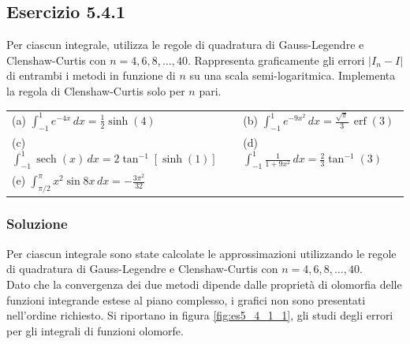 \documentclass[letterpaper, 12pt]{article}
\numberwithin{equation}{section}    %
\begin{document}
\subsection{Esercizio 5.4.1}
Per ciascun integrale, utilizza le regole di quadratura di Gauss-Legendre e 
Clenshaw-Curtis con $n=4,6,8,\ldots,40$. Rappresenta graficamente gli errori $|I_n-I|$ di entrambi i metodi 
in funzione di $n$ su una scala semi-logaritmica. Implementa la regola di 
Clenshaw-Curtis solo per $n$ pari.

\begin{tabular}{@{}ll@{}}
(a) $\displaystyle\int_{-1}^1 e^{-4x}\, dx = \frac{1}{2}\sinh(4)$
    & (b) $\displaystyle\int_{-1}^1 e^{-9x^2}\, dx = \frac{\sqrt{\pi}}{3}\, \operatorname{erf}(3)$ \\[1.5ex]
(c) $\displaystyle\int_{-1}^1 \operatorname{sech}(x) \, dx = 2 \tan^{-1} [ \sinh (1) ]$
    & (d) $\displaystyle\int_{-1}^1 \frac{1}{1+9x^2}\, dx = \frac{2}{3} \tan^{-1}(3)$ \\[1.5ex]
(e) $\displaystyle\int_{\pi/2}^{\pi} x^2 \sin 8x \, d x = -\frac{3 \pi^2}{32}$ & \\
\end{tabular}

\subsubsection{Soluzione}
Per ciascun integrale sono state calcolate le approssimazioni utilizzando le regole di quadratura di 
Gauss-Legendre e Clenshaw-Curtis con $n=4,6,8,\ldots,40$. \\
Dato che la convergenza dei due metodi dipende dalle proprietà di olomorfia delle funzioni integrande 
estese al piano complesso, i grafici non sono presentati nell'ordine richiesto.
Si riportano in figura \ref{fig:es5_4_1_1}, gli studi degli errori per gli integrali di funzioni olomorfe.
\end{document}
